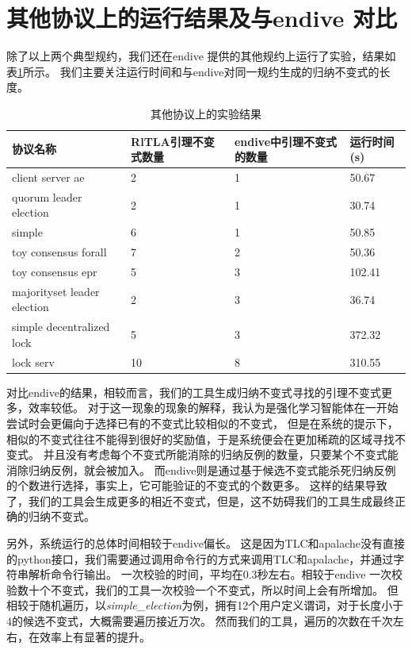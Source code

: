 \section{其他协议上的运行结果及与endive 对比}
除了以上两个典型规约，我们还在endive 提供的其他规约上运行了实验，结果如表\ref{tab:result}所示。
我们主要关注运行时间和\rltla 与endive对同一规约生成的归纳不变式的长度。
\begin{table}[!htbp]
	\centering
	\caption{其他协议上的实验结果}
	\renewcommand\arraystretch{1.4}
	\begin{tabular}{p{}p{}p{}p{}}
         \toprule
         \textbf{协议名称} &\textbf{RlTLA引理不变式数量} & \textbf{endive中引理不变式的数量}& \textbf{运行时间(s)}\\
         \midrule
         client server ae & 2 & 1 & 50.67\\
         quorum leader election& 2& 1 &30.74\\
         simple& 6& 1 &50.85\\
         toy consensus forall & 7 & 2&50.36  \\ 
         toy consensus epr & 5 & 3 &102.41  \\ 
         majorityset leader election& 2& 3 &36.74\\
         simple decentralized lock& 5 & 3 &372.32\\
         lock serv& 10 & 8 & 310.55\\
         \bottomrule
	\end{tabular}
	\label{tab:result}
\end{table}

对比endive的结果，相较而言，我们的工具生成归纳不变式寻找的引理不变式更多，效率较低。
对于这一现象的现象的解释，我认为是强化学习智能体在一开始尝试时会更偏向于选择已有的不变式比较相似的不变式，
但是在系统的提示下，相似的不变式往往不能得到很好的奖励值，于是系统便会在更加稀疏的区域寻找不变式。
并且没有考虑每个不变式所能消除的归纳反例的数量，只要某个不变式能消除归纳反例，就会被加入。
而endive则是通过基于候选不变式能杀死归纳反例的个数进行选择，事实上，它可能验证的不变式的个数更多。
这样的结果导致了，我们的工具会生成更多的相近不变式，但是，这不妨碍我们的工具生成最终正确的归纳不变式。

另外，系统运行的总体时间相较于endive偏长。
这是因为TLC和apalache没有直接的python接口，我们需要通过调用命令行的方式来调用TLC和apalache，并通过字符串解析命令行输出。
一次校验的时间，平均在0.3秒左右。相较于endive 一次校验数十个不变式，我们的工具一次校验一个不变式，所以时间上会有所增加。
但相较于随机遍历，以\textit{simple\_election}为例，拥有12个用户定义谓词，对于长度小于4的候选不变式，大概需要遍历接近万次。
然而我们的工具，遍历的次数在千次左右，在效率上有显著的提升。

